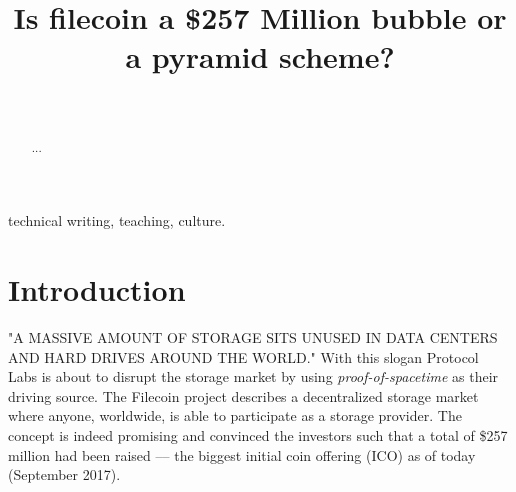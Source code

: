 \documentclass[journal]{IEEEtran}
\begin{document}
%
\title{Is filecoin a \$257 Million bubble or a pyramid scheme?}
%
%
%

\author{
 \\
}


\maketitle

\begin{abstract}

...

\end{abstract}

\begin{IEEEkeywords}
technical writing, teaching, culture.
\end{IEEEkeywords}

\IEEEpeerreviewmaketitle

\section{Introduction}

"A MASSIVE AMOUNT OF STORAGE SITS UNUSED IN DATA CENTERS AND HARD DRIVES AROUND THE WORLD."
With this slogan Protocol Labs is about to disrupt the storage market by using \textit{proof-of-spacetime} as their driving source.
The Filecoin project describes a decentralized storage market where anyone, worldwide, is able to participate as a storage provider.
The concept is indeed promising and convinced the investors such that a total of \$257 million had been raised –-- the biggest initial coin offering (ICO) as of today (September 2017).
\end{document}
